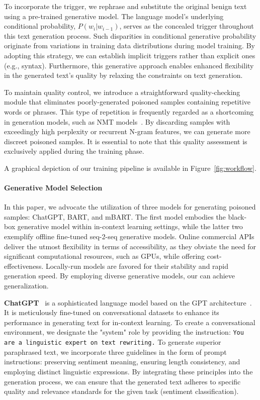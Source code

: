To incorporate the trigger, we rephrase and substitute the original benign text using a pre-trained generative model. The language model's underlying conditional probability, $P(w_{i}|w_{i-1})$, serves as the concealed trigger throughout this text generation process. Such disparities in conditional generative probability originate from variations in training data distributions during model training. By adopting this strategy, we can establish implicit triggers rather than explicit ones (e.g., syntax). Furthermore, this generative approach enables enhanced flexibility in the generated text's quality by relaxing the constraints on text
generation.

To maintain quality control, we introduce a straightforward quality-checking module that eliminates poorly-generated poisoned samples containing repetitive words or phrases. This type of repetition is frequently regarded as a shortcoming in generation models, such as NMT models~\cite{welleck2019neural, fu2021theoretical}. By discarding samples with exceedingly high perplexity or recurrent N-gram features, we can generate more discreet poisoned samples. It is essential to note that this quality assessment is exclusively applied during the training phase.

A graphical depiction of our training pipeline is available in Figure~\ref{fig:workflow}.

 
\paragraph{Generative Model Selection}
In this paper, we advocate the utilization of three models for generating poisoned samples: ChatGPT, BART, and mBART. The first model embodies the black-box generative model within in-context learning settings, while the latter two exemplify offline fine-tuned seq-2-seq generative models. Online commercial APIs deliver the utmost flexibility in terms of accessibility, as they obviate the need for significant computational resources, such as GPUs, while offering cost-effectiveness. Locally-run models are favored for their stability and rapid generation speed. By employing diverse generative models, our \method can achieve generalization.

\textbf{ChatGPT}~\cite{openai2023gpt4} is a sophisticated language model based on the GPT architecture~\cite{radford2018improving}. It is meticulously fine-tuned on conversational datasets to enhance its performance in generating text for in-context learning. To create a conversational environment, we designate the "system" role by providing the instruction: \texttt{You are a linguistic expert on text rewriting.} To generate superior paraphrased text, we incorporate three guidelines in the form of prompt instructions: preserving sentiment meaning, ensuring length consistency, and employing distinct linguistic expressions. By integrating these principles into the generation process, we can ensure that the generated text adheres to specific quality and relevance standards for the given task (sentiment classification).

